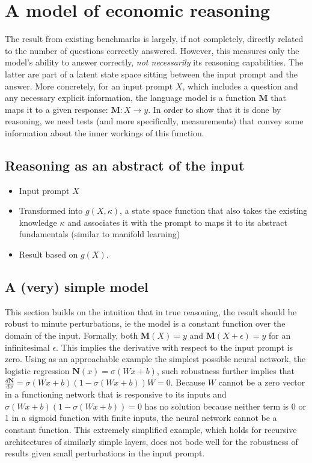 \documentclass[
]{article}
\begin{document}
\section{A model of economic
reasoning}\label{a-model-of-economic-reasoning}

The result from existing benchmarks is largely, if not completely,
directly related to the number of questions correctly answered. However,
this measures only the model's ability to answer correctly, \emph{not
necessarily} its reasoning capabilities. The latter are part of a latent
state space sitting between the input prompt and the answer. More
concretely, for an input prompt \(X\), which includes a question and any
necessary explicit information, the language model is a function
\(\mathbf{M}\) that maps it to a given response:
\(\mathbf{M} : X \to y\). In order to show that it is done by reasoning,
we need tests (and more specifically, measurements) that convey some
information about the inner workings of this function.

\subsection{Reasoning as an abstract of the
input}\label{reasoning-as-an-abstract-of-the-input}

\begin{itemize}
\item
  Input prompt \(X\)
\item
  Transformed into \(g(X, \kappa)\), a state space function that also
  takes the existing knowledge \(\kappa\) and associates it with the
  prompt to maps it to its abstract fundamentals (similar to manifold
  learning)
\item
  Result based on \(g(X)\).
\end{itemize}

\subsection{A (very) simple model}\label{a-very-simple-model}

This section builds on the intuition that in true reasoning, the result
should be robust to minute perturbations, ie the model is a constant
function over the domain of the input. Formally, both
\(\mathbf{M}(X) = y\) and \(\mathbf{M}(X + \epsilon) = y\) for an
infinitesimal \(\epsilon\). This implies the derivative with respect to
the input prompt is zero. Using as an approachable example the simplest
possible neural network, the logistic regression
\(\mathbf{N}(x) = \sigma(Wx + b)\), such robustness further implies that
\(\frac{d\mathbf{N}}{d x} = \sigma(Wx + b)(1-\sigma(Wx + b))W = 0\).
Because \(W\) cannot be a zero vector in a functioning network that is
responsive to its inputs and \(\sigma(Wx + b)(1-\sigma(Wx + b)) = 0\)
has no solution because neither term is 0 or 1 in a sigmoid function
with finite inputs, the neural network cannot be a constant function.
This extremely simplified example, which holds for recursive
architectures of similarly simple layers, does not bode well for the
robustness of results given small perturbations in the input prompt.
\end{document}
